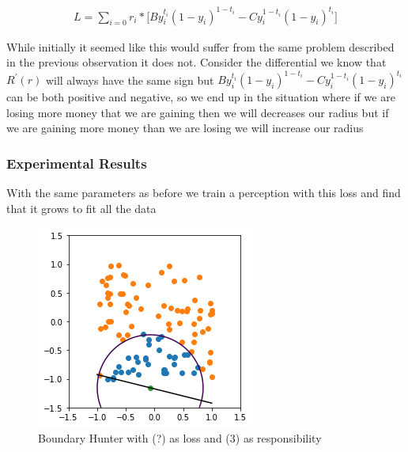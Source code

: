 \documentclass{article}
\begin{document}
\begin{align}
L = \sum_{i=0} r_i * \big[ By_i^{t_i}(1-y_i)^{1-t_i} - Cy_i^{1-t_i}(1-y_i)^{t_i} \big] 
\end{align}

While initially it seemed like this would suffer from the same problem described in the previous observation it does not. Consider the differential we know that $R^{'}(r)$ will always have the same sign but $By_i^{t_i}(1-y_i)^{1-t_i} - Cy_i^{1-t_i}(1-y_i)^{t_i}$ can be both positive and negative, so we end up in the situation where if we are losing more money that we are gaining then we will decreases our radius but if we are gaining more money than we are losing we will increase our radius

\subsubsection{Experimental Results}

With the same parameters as before we train a perception with this loss and find that it grows to fit all the data

\begin{figure}[H]
\centering
  \begin{minipage}[b]{0.4\textwidth}
    \includegraphics[width=\textwidth]{BoundaryHunter-Attempt3-R2.png}
    \caption{Boundary Hunter with (?) as loss and (3) as responsibility}
  \end{minipage}
  \hfill
\end{figure}
\end{document}
